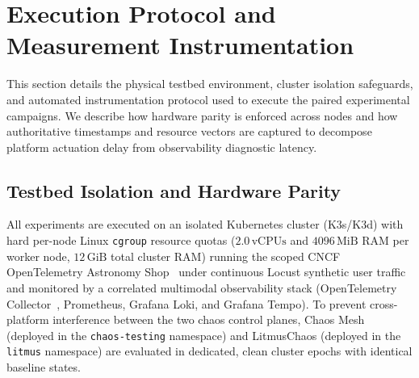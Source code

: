 \section{Execution Protocol and Measurement Instrumentation}
\label{sec:execution_protocol}

This section details the physical testbed environment, cluster isolation safeguards, and automated instrumentation protocol used to execute the paired experimental campaigns. We describe how hardware parity is enforced across nodes and how authoritative timestamps and resource vectors are captured to decompose platform actuation delay from observability diagnostic latency.

\subsection{Testbed Isolation and Hardware Parity}
All experiments are executed on an isolated Kubernetes cluster (K3s/K3d) with hard per-node Linux \texttt{cgroup} resource quotas ($2.0\,\text{vCPUs}$ and $4096\,\text{MiB}$ RAM per worker node, $12\,\text{GiB}$ total cluster RAM) running the scoped CNCF OpenTelemetry Astronomy Shop~\cite{opentelemetry_demo} under continuous Locust synthetic user traffic~\cite{locust_framework} and monitored by a correlated multimodal observability stack (OpenTelemetry Collector~\cite{wang2024building}, Prometheus, Grafana Loki, and Grafana Tempo). To prevent cross-platform interference between the two chaos control planes, Chaos Mesh (deployed in the \texttt{chaos-testing} namespace) and LitmusChaos (deployed in the \texttt{litmus} namespace) are evaluated in dedicated, clean cluster epochs with identical baseline states.


